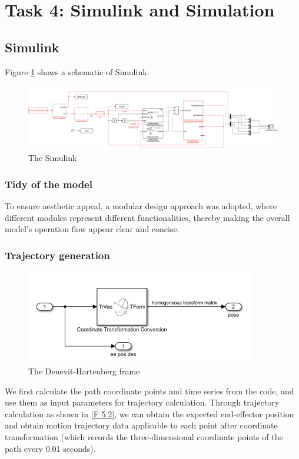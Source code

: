 \section{Task 4: Simulink and Simulation}
\FloatBarrier %

\subsection{Simulink}
Figure \ref{F 5.1} shows a schematic of Simulink.
\begin{figure}[htp]
    \centering
    \includegraphics[width=17cm]{./fig/sim.jpg}
    \caption{The Simulink}
    \label{F 5.1}
\end{figure}

\subsubsection*{Tidy of the model}
To ensure aesthetic appeal, a modular design approach was adopted, where different modules represent different functionalities, thereby making the overall model's operation flow appear clear and concise.

\subsubsection*{Trajectory generation}

\begin{figure}[htbp]
    \centering
    \includegraphics[width=10cm]{./fig/traj.png}
    \caption{The Denevit-Hartenberg frame}
    \label{F 5.2}
\end{figure}

We first calculate the path coordinate points and time series from the code, and use them as input parameters for trajectory calculation. Through trajectory calculation as shown in \autoref{F 5.2}, we can obtain the expected end-effector position and obtain motion trajectory data applicable to each point after coordinate transformation (which records the three-dimensional coordinate points of the path every 0.01 seconds).

